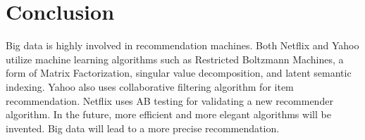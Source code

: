 \documentclass[sigconf]{acmart}
\begin{document}
\section{Conclusion}
Big data is highly involved in recommendation machines.  Both Netflix and Yahoo utilize machine learning algorithms such as Restricted Boltzmann Machines, a form of Matrix Factorization, singular value decomposition, and latent semantic indexing. Yahoo also uses collaborative filtering algorithm for item recommendation. Netflix uses AB testing for validating a new recommender algorithm. In the future, more efficient and more elegant algorithms will be invented. Big data will lead to a more precise recommendation.  


 


\end{document}
